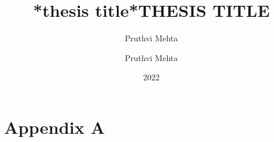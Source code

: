 \documentclass[11pt,twoside]{report}
\title{*thesis title*}
\author{Pruthvi Mehta}
\date{2022}
\title{THESIS TITLE} \let\Title\@title
\author{Pruthvi Mehta} \let\Author\@author
\begin{document}


\cleardoublepage


\begin{singlespace}

  
  
  
  \end{singlespace}
  \cleardoublepage

    \maketitle



    \tableofcontents


    

    
    
    
    
    
    
    
 

      
    


\appendix
\chapter{Appendix A}

\end{document}
